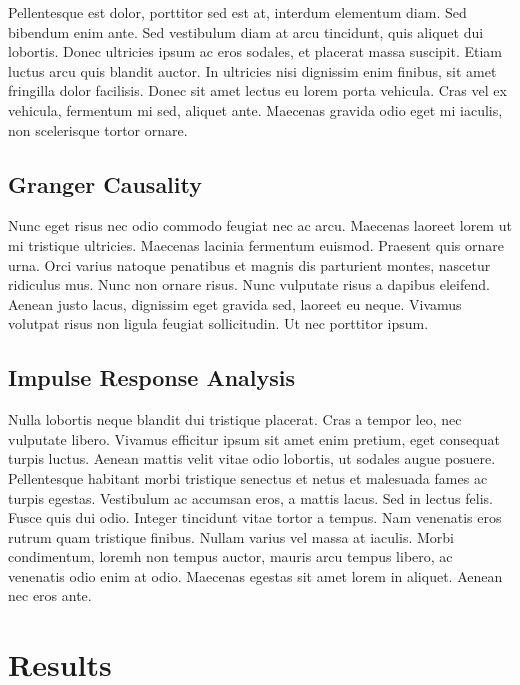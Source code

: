 \documentclass{article}
\begin{document}
Pellentesque est dolor, porttitor sed est at, interdum elementum diam.
Sed bibendum enim ante. Sed vestibulum diam at arcu tincidunt, quis
aliquet dui lobortis. Donec ultricies ipsum ac eros sodales, et placerat
massa suscipit. Etiam luctus arcu quis blandit auctor. In ultricies nisi
dignissim enim finibus, sit amet fringilla dolor facilisis. Donec sit
amet lectus eu lorem porta vehicula. Cras vel ex vehicula, fermentum mi
sed, aliquet ante. Maecenas gravida odio eget mi iaculis, non
scelerisque tortor ornare.

\hypertarget{granger-causality}{%
\subsection{Granger Causality}\label{granger-causality}}

Nunc eget risus nec odio commodo feugiat nec ac arcu. Maecenas laoreet
lorem ut mi tristique ultricies. Maecenas lacinia fermentum euismod.
Praesent quis ornare urna. Orci varius natoque penatibus et magnis dis
parturient montes, nascetur ridiculus mus. Nunc non ornare risus. Nunc
vulputate risus a dapibus eleifend. Aenean justo lacus, dignissim eget
gravida sed, laoreet eu neque. Vivamus volutpat risus non ligula feugiat
sollicitudin. Ut nec porttitor ipsum.

\hypertarget{impulse-response-analysis}{%
\subsection{Impulse Response Analysis}\label{impulse-response-analysis}}

Nulla lobortis neque blandit dui tristique placerat. Cras a tempor leo,
nec vulputate libero. Vivamus efficitur ipsum sit amet enim pretium,
eget consequat turpis luctus. Aenean mattis velit vitae odio lobortis,
ut sodales augue posuere. Pellentesque habitant morbi tristique senectus
et netus et malesuada fames ac turpis egestas. Vestibulum ac accumsan
eros, a mattis lacus. Sed in lectus felis. Fusce quis dui odio. Integer
tincidunt vitae tortor a tempus. Nam venenatis eros rutrum quam
tristique finibus. Nullam varius vel massa at iaculis. Morbi
condimentum, loremh non tempus auctor, mauris arcu tempus libero, ac
venenatis odio enim at odio. Maecenas egestas sit amet lorem in aliquet.
Aenean nec eros ante.

\hypertarget{results}{%
\section{Results}\label{results}}
\end{document}
